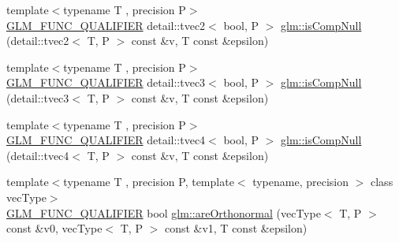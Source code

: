 \begin{DoxyCompactItemize}
\item 
{\footnotesize template$<$typename T , precision P$>$ }\\\hyperlink{setup_8hpp_a33fdea6f91c5f834105f7415e2a64407}{G\+L\+M\+\_\+\+F\+U\+N\+C\+\_\+\+Q\+U\+A\+L\+I\+F\+I\+ER} detail\+::tvec2$<$ bool, P $>$ \hyperlink{namespaceglm_aebe68f230864fef7977c028095daed90}{glm\+::is\+Comp\+Null} (detail\+::tvec2$<$ T, P $>$ const \&v, T const \&epsilon)
\item 
{\footnotesize template$<$typename T , precision P$>$ }\\\hyperlink{setup_8hpp_a33fdea6f91c5f834105f7415e2a64407}{G\+L\+M\+\_\+\+F\+U\+N\+C\+\_\+\+Q\+U\+A\+L\+I\+F\+I\+ER} detail\+::tvec3$<$ bool, P $>$ \hyperlink{namespaceglm_a2887bbd9268d732d99ee19e4d7c8d409}{glm\+::is\+Comp\+Null} (detail\+::tvec3$<$ T, P $>$ const \&v, T const \&epsilon)
\item 
{\footnotesize template$<$typename T , precision P$>$ }\\\hyperlink{setup_8hpp_a33fdea6f91c5f834105f7415e2a64407}{G\+L\+M\+\_\+\+F\+U\+N\+C\+\_\+\+Q\+U\+A\+L\+I\+F\+I\+ER} detail\+::tvec4$<$ bool, P $>$ \hyperlink{namespaceglm_a4d5c5e644868935f8825fbe6a66ca562}{glm\+::is\+Comp\+Null} (detail\+::tvec4$<$ T, P $>$ const \&v, T const \&epsilon)
\item 
{\footnotesize template$<$typename T , precision P, template$<$ typename, precision $>$ class vec\+Type$>$ }\\\hyperlink{setup_8hpp_a33fdea6f91c5f834105f7415e2a64407}{G\+L\+M\+\_\+\+F\+U\+N\+C\+\_\+\+Q\+U\+A\+L\+I\+F\+I\+ER} bool \hyperlink{group__gtx__vector__query_ga89c82bc60e5b84e4489b74c15a134caf}{glm\+::are\+Orthonormal} (vec\+Type$<$ T, P $>$ const \&v0, vec\+Type$<$ T, P $>$ const \&v1, T const \&epsilon)
\end{DoxyCompactItemize}
